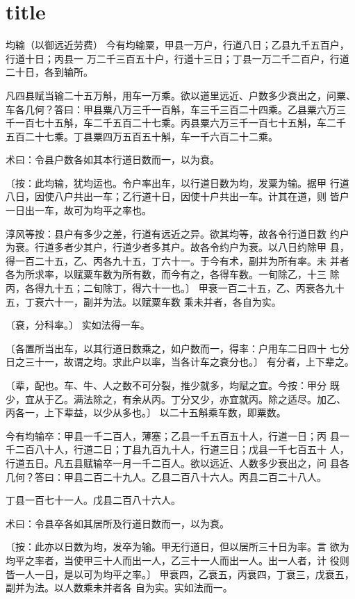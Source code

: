 \documentclass[a4paper,12pt,UTF8,twoside]{ctexbook}
\begin{document}
\chapter{title}
均输（以御远近劳费） 今有均输粟，甲县一万户，行道八日；乙县九千五百户，行道十日；丙县一 万二千三百五十户，行道十三日；丁县一万二千二百户，行道二十日，各到输所。

凡四县赋当输二十五万斛，用车一万乘。欲以道里远近、户数多少衰出之，问粟、 车各几何？答曰：甲县粟八万三千一百斛，车三千三百二十四乘。乙县粟六万三 千一百七十五斛，车二千五百二十七乘。丙县粟六万三千一百七十五斛，车二千 五百二十七乘。丁县粟四万五百五十斛，车一千六百二十二乘。

术曰：令县户数各如其本行道日数而一，以为衰。

〔按：此均输，犹均运也。令户率出车，以行道日数为均，发粟为输。据甲 行道八日，因使八户共出一车；乙行道十日，因使十户共出一车。计其在道，则 皆户一日出一车，故可为均平之率也。

淳风等按：县户有多少之差，行道有远近之异。欲其均等，故各令行道日数 约户为衰。行道多者少其户，行道少者多其户。故各令约户为衰。以八日约除甲 县，得一百二十五，乙、丙各九十五，丁六十一。于今有术，副并为所有率。未 并者各为所求率，以赋粟车数为所有数，而今有之，各得车数。一旬除乙，十三 除丙，各得九十五；二旬除丁，得六十一也。〕 甲衰一百二十五，乙、丙衰各九十五，丁衰六十一，副并为法。以赋粟车数 乘未并者，各自为实。

〔衰，分科率。〕 实如法得一车。

〔各置所当出车，以其行道日数乘之，如户数而一，得率：户用车二日四十 七分日之三十一，故谓之均。求此户以率，当各计车之衰分也。〕 有分者，上下辈之。

〔辈，配也。车、牛、人之数不可分裂，推少就多，均赋之宜。今按：甲分 既少，宜从于乙。满法除之，有余从丙。丁分又少，亦宜就丙。除之适尽。加乙、 丙各一，上下辈益，以少从多也。〕 以二十五斛乘车数，即粟数。

今有均输卒：甲县一千二百人，薄塞；乙县一千五百五十人，行道一日；丙 县一千二百八十人，行道二日；丁县九百九十人，行道三日；戊县一千七百五十 人，行道五日。凡五县赋输卒一月一千二百人。欲以远近、人数多少衰出之，问 县各几何？答曰：甲县二百二十九人。乙县二百八十六人。丙县二百二十八人。

丁县一百七十一人。戊县二百八十六人。

术曰：令县卒各如其居所及行道日数而一，以为衰。

〔按：此亦以日数为均，发卒为输。甲无行道日，但以居所三十日为率。言 欲为均平之率者，当使甲三十人而出一人，乙三十一人而出一人。出一人者，计 役则皆一人一日，是以可为均平之率。〕 甲衰四，乙衰五，丙衰四，丁衰三，戊衰五，副并为法。以人数乘未并者各 自为实。实如法而一。
\end{document}
